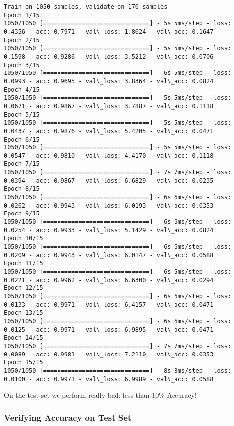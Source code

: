 \documentclass[11pt]{article}
\begin{document}
    \begin{Verbatim}[commandchars=\\\{\}]
Train on 1050 samples, validate on 170 samples
Epoch 1/15
1050/1050 [==============================] - 5s 5ms/step - loss: 0.4356 - acc: 0.7971 - val\_loss: 1.8624 - val\_acc: 0.1647
Epoch 2/15
1050/1050 [==============================] - 5s 5ms/step - loss: 0.1598 - acc: 0.9286 - val\_loss: 3.5212 - val\_acc: 0.0706
Epoch 3/15
1050/1050 [==============================] - 6s 5ms/step - loss: 0.0993 - acc: 0.9695 - val\_loss: 3.8364 - val\_acc: 0.0824
Epoch 4/15
1050/1050 [==============================] - 5s 5ms/step - loss: 0.0671 - acc: 0.9867 - val\_loss: 3.7887 - val\_acc: 0.1118
Epoch 5/15
1050/1050 [==============================] - 5s 5ms/step - loss: 0.0437 - acc: 0.9876 - val\_loss: 5.4205 - val\_acc: 0.0471
Epoch 6/15
1050/1050 [==============================] - 5s 5ms/step - loss: 0.0547 - acc: 0.9810 - val\_loss: 4.4170 - val\_acc: 0.1118
Epoch 7/15
1050/1050 [==============================] - 7s 7ms/step - loss: 0.0394 - acc: 0.9867 - val\_loss: 6.6829 - val\_acc: 0.0235
Epoch 8/15
1050/1050 [==============================] - 6s 6ms/step - loss: 0.0262 - acc: 0.9943 - val\_loss: 6.0193 - val\_acc: 0.0353
Epoch 9/15
1050/1050 [==============================] - 6s 6ms/step - loss: 0.0254 - acc: 0.9933 - val\_loss: 5.1429 - val\_acc: 0.0824
Epoch 10/15
1050/1050 [==============================] - 6s 6ms/step - loss: 0.0209 - acc: 0.9943 - val\_loss: 6.0147 - val\_acc: 0.0588
Epoch 11/15
1050/1050 [==============================] - 6s 5ms/step - loss: 0.0221 - acc: 0.9962 - val\_loss: 6.6300 - val\_acc: 0.0294
Epoch 12/15
1050/1050 [==============================] - 6s 6ms/step - loss: 0.0133 - acc: 0.9971 - val\_loss: 6.4157 - val\_acc: 0.0471
Epoch 13/15
1050/1050 [==============================] - 6s 6ms/step - loss: 0.0125 - acc: 0.9971 - val\_loss: 6.9895 - val\_acc: 0.0471
Epoch 14/15
1050/1050 [==============================] - 7s 7ms/step - loss: 0.0089 - acc: 0.9981 - val\_loss: 7.2110 - val\_acc: 0.0353
Epoch 15/15
1050/1050 [==============================] - 8s 8ms/step - loss: 0.0100 - acc: 0.9971 - val\_loss: 6.9989 - val\_acc: 0.0588

    \end{Verbatim}

    On the test set we perform really bad: less than 10\% Accuracy!

    \subsubsection{Verifying Accuracy on Test
Set}\label{verifying-accuracy-on-test-set}
\end{document}
